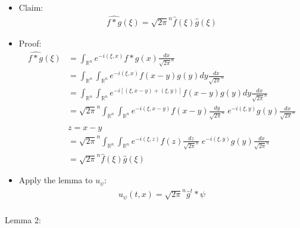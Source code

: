 \documentclass[12pt, a4paper]{article}
\begin{document}
\begin{itemize}
    \item Claim:
    \begin{align*}
        \widehat{f*g}(\xi) = \sqrt{2\pi}^n\hat{f}(\xi)\hat{g}(\xi)
    \end{align*}
    \item Proof:
    \begin{align*}
        \widehat{f*g}(\xi) &= \int_{\mathbb{R}^n}e^{-i(\xi, x)}f*g(x)\frac{dx}{\sqrt{2\pi}^n}\\
        &= \int_{\mathbb{R}^n}\int_{\mathbb{R}^n}e^{-i(\xi, x)}f(x-y)g(y)dy\frac{dx}{\sqrt{2\pi}^n}\\
        &= \int_{\mathbb{R}^n}\int_{\mathbb{R}^n}e^{-i[(\xi, x-y)+(\xi, y)]}f(x-y)g(y)dy\frac{dx}{\sqrt{2\pi}^n}\\
        &= \sqrt{2\pi}^n\int_{\mathbb{R}^n}\int_{\mathbb{R}^n}e^{-i(\xi, x-y)}f(x-y)\frac{dy}{\sqrt{2\pi}^n}\; e^{-i(\xi, y)}g(y)\frac{dx}{\sqrt{2\pi}^n}\\\\
        &z = x-y\\
        &= \sqrt{2\pi}^n\int_{\mathbb{R}^n}\int_{\mathbb{R}^n}e^{-i(\xi, z)}f(z)\frac{dz}{\sqrt{2\pi}^n}\; e^{-i(\xi, y)}g(y)\frac{dx}{\sqrt{2\pi}^n}\\
        &= \sqrt{2\pi}^n\hat{f}(\xi)\hat{g}(\xi)
    \end{align*}
    \item Apply the lemma to $u_\psi$:
    \begin{align*}
        u_\psi(t, x) = \sqrt{2\pi}^n \hat{g}^t*\psi\\
    \end{align*}
\end{itemize}
Lemma 2:
\end{document}
